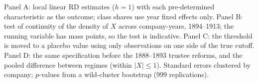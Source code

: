 Panel A: local linear RD estimates ($h = 1$) with each pre-determined characteristic as the outcome; class shares use year fixed effects only. Panel B: test of continuity of the density of $X$ across company-years, 1894--1913; the running variable has mass points, so the test is indicative. Panel C: the threshold is moved to a placebo value using only observations on one side of the true cutoff. Panel D: the same specification before the 1888--1893 trustee reforms, and the pooled difference between regimes (within $|X| \le 1$). Standard errors clustered by company; $p$-values from a wild-cluster bootstrap (999 replications).
